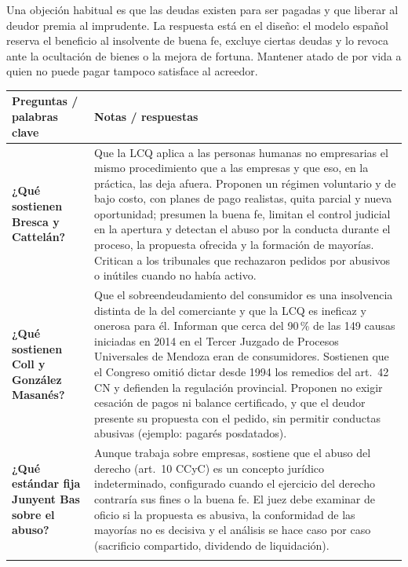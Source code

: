 \documentclass[12pt,oneside]{book}
\makeatletter
\renewcommand\section{\@startsection{section}{1}{\z@}{-3.5ex \@plus -1ex \@minus -.2ex}{2.3ex \@plus.2ex}{\normalfont\Large\bfseries\raggedright}}
\newenvironment{cornell}{%
  \renewcommand{\arraystretch}{1.2}%
  \begin{longtable}{@{}>{\raggedright\arraybackslash}p{0.27\textwidth}|>{\raggedright\arraybackslash}p{0.65\textwidth}@{}}
  \toprule
  \textbf{Preguntas / palabras clave} & \textbf{Notas / respuestas} \\
  \midrule
  \endhead
}{%
  \bottomrule
  \end{longtable}%
}
\makeatother
\begin{document}
Una objeción habitual es que las deudas existen para ser pagadas y que liberar al deudor premia al imprudente. La respuesta está en el diseño: el modelo español reserva el beneficio al insolvente de buena fe, excluye ciertas deudas y lo revoca ante la ocultación de bienes o la mejora de fortuna. Mantener atado de por vida a quien no puede pagar tampoco satisface al acreedor.

\section{Cuadro Cornell}

\begin{cornell}
\textbf{¿Qué sostienen Bresca y Cattelán?} &
Que la LCQ aplica a las personas humanas no empresarias el mismo procedimiento que a las empresas y que eso, en la práctica, las deja afuera. Proponen un régimen voluntario y de bajo costo, con planes de pago realistas, quita parcial y nueva oportunidad; presumen la buena fe, limitan el control judicial en la apertura y detectan el abuso por la conducta durante el proceso, la propuesta ofrecida y la formación de mayorías. Critican a los tribunales que rechazaron pedidos por abusivos o inútiles cuando no había activo. \\
\addlinespace

\textbf{¿Qué sostienen Coll y González Masanés?} &
Que el sobreendeudamiento del consumidor es una insolvencia distinta de la del comerciante y que la LCQ es ineficaz y onerosa para él. Informan que cerca del 90\,\% de las 149 causas iniciadas en 2014 en el Tercer Juzgado de Procesos Universales de Mendoza eran de consumidores. Sostienen que el Congreso omitió dictar desde 1994 los remedios del art.~42 CN y defienden la regulación provincial. Proponen no exigir cesación de pagos ni balance certificado, y que el deudor presente su propuesta con el pedido, sin permitir conductas abusivas (ejemplo: pagarés posdatados). \\
\addlinespace

\textbf{¿Qué estándar fija Junyent Bas sobre el abuso?} &
Aunque trabaja sobre empresas, sostiene que el abuso del derecho (art.~10 CCyC) es un concepto jurídico indeterminado, configurado cuando el ejercicio del derecho contraría sus fines o la buena fe. El juez debe examinar de oficio si la propuesta es abusiva, la conformidad de las mayorías no es decisiva y el análisis se hace caso por caso (sacrificio compartido, dividendo de liquidación). \\
\addlinespace


\end{cornell}
\end{document}

